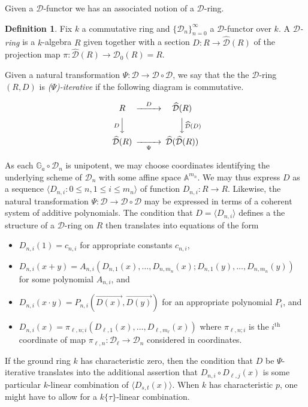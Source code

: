 \documentclass{amsart}
\newcommand{\Ga}{{{\mathbb G}_a}}
\newcommand{\cD}{{\mathcal D}}
\theoremstyle{definition}
\newtheorem{Def}[thm]{Definition}
\theoremstyle{remark}
\begin{document}
Given a $\cD$-functor we has an associated notion of a $\cD$-ring.

\begin{Def}
Fix $k$ a commutative ring and $\{ \cD_n \}_{n=0}^\infty$ a 
$\cD$-functor over $k$.  A \emph{$\cD$-ring} is a $k$-algebra
$R$ given together with a section $D:R \to \widehat{\cD}(R)$ 
of the projection map $\pi:\widehat{\cD}(R) \to \cD_0(R) = R$.  

Given a natural transformation $\Psi: \cD \to \cD \circ \cD$, we say that
the the $\cD$-ring $(R, D)$ is \emph{($\Psi$)-iterative} if the
following diagram is commutative.

$$
\begin{CD}
R @>{D}>> \widehat{\cD}(R) \\
@V{D}VV 	     @VV{\widehat{\cD}(D)}V \\
\widehat{\cD}(R) @>>\Psi> \widehat{\cD} (\widehat{\cD} (R)) 
\end{CD}
$$
\end{Def}

As each $\Ga \circ \cD_n$ is unipotent, we may choose coordinates
identifying the underlying scheme of $\cD_n$ with some affine space
${\mathbb A}^{m_n}$.  We may thus express $D$ as a sequence 
$\langle D_{n,i} : 0 \leq n, 1 \leq i \leq m_n \rangle$ of 
function $D_{n,i}:R \to R$.  
Likewise, the natural transformation $\Psi: \cD \to \cD \circ \cD$ may 
be expressed in terms of a coherent system of additive polynomials.  
The condition that $D = \langle D_{n,i}  \rangle $ defines
a the structure of a $\cD$-ring on $R$ then translates into equations of the form
\begin{itemize}
\item $D_{n,i}(1) = c_{n,i}$ for appropriate constants $c_{n,i}$,
\item $D_{n,i}(x + y) = A_{n,i}(D_{n,1}(x), \ldots, D_{n,m_n}(x);D_{n,1}(y), \ldots, D_{n,m_n}(y))$
 for some polynomial $A_{n,i}$, and
\item $D_{n,i}(x \cdot y) = P_{n,i}(\vec{D(x)}, \vec{D(y)})$
 for an appropriate polynomial $P_i$, and
\item $D_{n,i}(x) = \pi_{\ell,n;i}(D_{\ell, 1}(x), \ldots, D_{\ell, m_\ell}(x))$
	where $\pi_{\ell,n;i}$ is the $i^\text{th}$ coordinate of map
	 $\pi_{\ell,n}: \cD_\ell \to \cD_n$ considered in coordinates.
\end{itemize}

If the ground ring $k$ has characteristic zero, then the condition that $D$ be 
$\Psi$-iterative translates into the additional assertion that $D_{n,i} \circ D_{\ell,j} (x)$ is some 
particular $k$-linear combination of $\langle D_{s,t}(x) \rangle $.  When $k$ has
characteristic $p$, one might have to allow for a $k \{ \tau \}$-linear combination.
\end{document}
